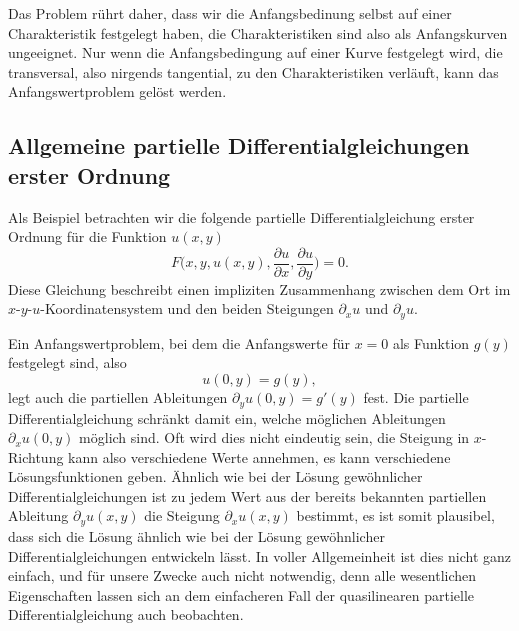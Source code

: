 Das Problem rührt daher, dass wir die Anfangsbedinung selbst auf einer
Charakteristik festgelegt haben, die Charakteristiken sind also als
Anfangskurven ungeeignet. Nur wenn die Anfangsbedingung auf einer Kurve
festgelegt wird, die transversal, also nirgends tangential, zu den
Charakteristiken verläuft, kann das Anfangswertproblem gelöst werden.

\subsection{Allgemeine partielle Differentialgleichungen erster Ordnung}
Als Beispiel betrachten wir die folgende partielle Differentialgleichung
erster Ordnung für die Funktion $u(x,y)$
\begin{equation}
F\biggl(
x,y,u(x,y),\frac{\partial u}{\partial x},\frac{\partial u}{\partial y}
\biggr)=0.
\end{equation}
Diese Gleichung beschreibt einen impliziten Zusammenhang zwischen
dem Ort im $x$-$y$-$u$-Ko\-or\-di\-na\-ten\-sys\-tem und den beiden Steigungen
$\partial_xu$ und $\partial_yu$.

Ein Anfangswertproblem, bei dem die Anfangswerte für $x=0$ als
Funktion $g(y)$ festgelegt sind, also
\[
u(0,y)=g(y),
\]
legt auch die
partiellen Ableitungen $\partial_y u(0,y)=g'(y)$ fest.  Die partielle
Differentialgleichung schränkt damit ein, welche möglichen Ableitungen
$\partial_xu(0,y)$ möglich sind. Oft wird dies nicht eindeutig sein,
die Steigung in $x$-Richtung kann also verschiedene Werte annehmen,
es kann verschiedene Lösungsfunktionen geben. Ähnlich wie bei der
Lösung gewöhnlicher Differentialgleichungen ist zu jedem Wert
aus der bereits bekannten partiellen Ableitung $\partial_yu(x,y)$
die Steigung $\partial_xu(x,y)$ bestimmt, es ist somit plausibel, dass
sich die Lösung ähnlich wie bei der Lösung gewöhnlicher Differentialgleichungen
entwickeln lässt. In voller Allgemeinheit ist dies nicht ganz einfach,
und für unsere Zwecke auch nicht notwendig, denn alle wesentlichen
Eigenschaften lassen sich an dem einfacheren Fall der quasilinearen
partielle Differentialgleichung auch beobachten.


